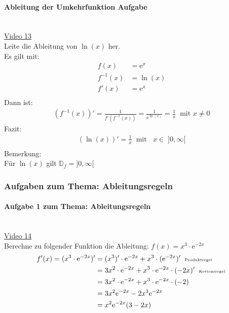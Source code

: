 \paragraph{Ableitung der Umkehrfunktion Aufgabe}$  $\vspace*{3mm}\\
\href{https://youtu.be/krjiEulDq-g}{Video 13}\\
Leite die Ableitung von $ \ln(x) $ her.\\
Es gilt mit:\\
\begin{align*}
f(x)&=\mathrm{e}^x\\
f^{-1}(x)&=\ln(x)\\
f'(x)&=\mathrm{e}^x\\
\end{align*}
Dann ist:\\
\begin{align*}
(f^{-1}(x))'=\frac{1}{f'(f^{-1}(x))}=\frac{1}{\mathrm{e}^{\ln(x)}}=\frac{1}{x}\;\;\text{mit } x\neq 0
\end{align*}
Fazit:\\
\begin{align*}
(\ln(x))'=\frac{1}{x}\;\;\text{mit }\;\;x\in \;]0,\infty[\\
\end{align*}
Bemerkung:\\
Für $ \ln(x) $ gilt $ \mathbb{D}_f=]0,\infty[ $
\subsubsection{Aufgaben zum Thema: Ableitungsregeln}
\paragraph{Aufgabe 1 zum Thema: Ableitungsregeln}$  $\vspace*{3mm}\\
\href{https://youtu.be/XE6Zkj9KDfg}{Video 14}\\
Berechne zu folgender Funktion die Ableitung: $ f(x)=x^3\cdot \mathrm{e}^{-2x} $\\
\begin{align*}
f'(x)=(x^3\cdot \mathrm{e}^{-2x})'&=(x^3)'\cdot \mathrm{e}^{-2x}+ x^3\cdot (\mathrm{e}^{-2x})'\;\;\text{\tiny Produktregel }\\
&=3x^2\cdot \mathrm{e}^{-2x}+x^3\cdot \mathrm{e}^{-2x}\cdot (-2x)'\;\;\text{\tiny Kettenrregel }\\
&=3x^2\cdot \mathrm{e}^{-2x}+ x^3\cdot \mathrm{e}^{-2x}\cdot (-2)\\
&=3x^2 \mathrm{e}^{-2x}-2 x^3 \mathrm{e}^{-2x} \\
&=x^2 \mathrm{e}^{-2x}(3-2x)\\
\end{align*}
\newpage
\noindent
